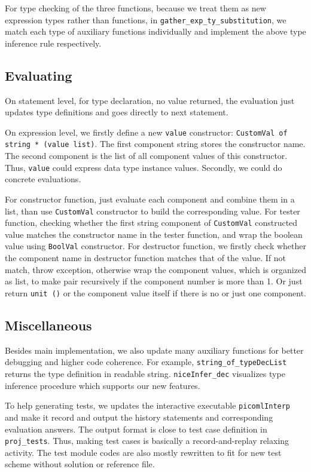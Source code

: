 \documentclass[a4paper,12pt]{article}
\begin{document}
		For type checking of the three functions, because we treat them as new expression types rather than functions, in \texttt{gather\_exp\_ty\_substitution}, we match each type of auxiliary functions individually and implement the above type inference rule respectively.
	
	\subsection{Evaluating}
		On statement level, for type declaration, no value returned, the evaluation just updates type definitions and goes directly to next statement.
		
		On expression level, we firstly define a new \texttt{value} constructor: \texttt{CustomVal of string * (value list)}. The first component string stores the constructor name. The second component is the list of all component values of this constructor. Thus, \texttt{value} could express data type instance values. Secondly, we could do concrete evaluations. 
		
		For constructor function, just evaluate each component and combine them in a list, than use \texttt{CustomVal} constructor to build the corresponding value. For tester function, checking whether the first string component of \texttt{CustomVal} constructed value matches the constructor name in the tester function, and wrap the boolean value using \texttt{BoolVal} constructor. For destructor function, we firstly check whether the component name in destructor function matches that of the value. If not match, throw exception, otherwise wrap the component values, which is organized as list, to make pair recursively if the component number is more than 1. Or just return \texttt{unit ()} or the component value itself if there is no or just one component.
	
	\subsection{Miscellaneous}
		Besides main implementation, we also update many auxiliary functions for better debugging and higher code coherence. For example, \texttt{string\_of\_typeDecList} returns the type definition in readable string. \texttt{niceInfer\_dec} visualizes type inference procedure which supports our new features.
		
		To help generating tests, we updates the interactive executable \texttt{picomlInterp} and make it record and output the history statements and corresponding evaluation answers. The output format is close to test case definition in \texttt{proj\_tests}. Thus, making test cases is basically a record-and-replay relaxing activity. The test module codes are also mostly rewritten to fit for new test scheme without solution or reference file.
\end{document}
